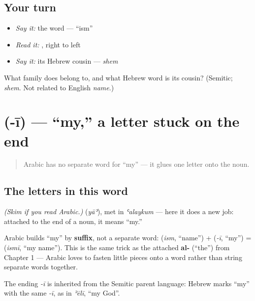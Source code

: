 \subsection*{Your turn}
\begin{itemize}
\raggedright
  \item \emph{Say it:} the word — \textquotedblleft{}ism\textquotedblright{}
  \item \emph{Read it:} \textbf{}, right to left
  \item \emph{Say it:} its Hebrew cousin — \emph{shem}
\end{itemize}

\begin{tcolorbox}[breakable,colback=teal!4,colframe=teal!35!black,title={Before you move on}]
What family does \textbf{} belong to, and what Hebrew word is its cousin? (Semitic; \emph{shem}. Not related to English \emph{name}.)
\end{tcolorbox}
\section[\texorpdfstring{\ar{ي} (-ī)}{ي (-ī)}]{ (-ī) — \textquotedblleft{}my,\textquotedblright{} a letter stuck on the end}

\label{lesson:AR-C02-ii-my}



\begin{quote}
Arabic has no separate word for \textquotedblleft{}my\textquotedblright{} — it glues one letter onto the noun.
\end{quote}

\subsection*{The letters in this word}
\emph{(Skim if you read Arabic.)} \textbf{} (\emph{yāʾ}), met in \emph{ʿalaykum} — here it does a new job: attached to the end of a noun, it means \textquotedblleft{}my.\textquotedblright{}

\begin{cousinweb}
Arabic builds \textquotedblleft{}my\textquotedblright{} by \textbf{suffix}, not a separate word: \textbf{} (\emph{ism}, \textquotedblleft{}name\textquotedblright{}) + \textbf{} (\emph{-ī}, \textquotedblleft{}my\textquotedblright{}) = \textbf{} (\emph{ismī}, \textquotedblleft{}my name\textquotedblright{}). This is the same trick as the attached \textbf{al-} (\textquotedblleft{}the\textquotedblright{}) from Chapter 1 — Arabic loves to fasten little pieces onto a word rather than string separate words together.

The ending \emph{-ī} is inherited from the Semitic parent language: Hebrew marks \textquotedblleft{}my\textquotedblright{} with the same \emph{-ī}, as in \emph{ʾēlī}, \textquotedblleft{}my God\textquotedblright{}.
\end{cousinweb}

